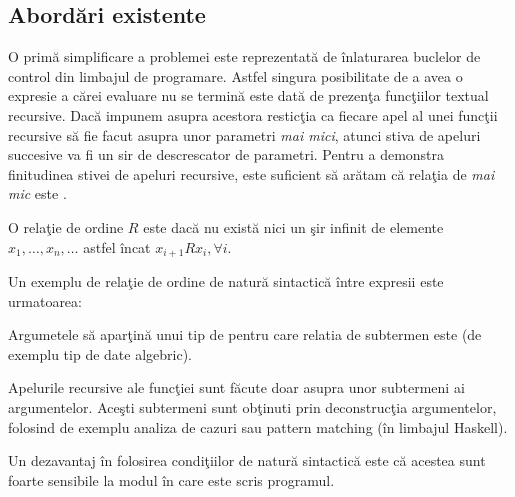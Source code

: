 \subsection{Abord\u ari existente}

O prim\u a simplificare a problemei este reprezentat\u a de \^inlaturarea buclelor de control din limbajul de programare. Astfel singura posibilitate de a avea o expresie a c\u arei evaluare nu se termin\u a este dat\u a de prezen\c ta func\c tiilor textual recursive. Dac\u a impunem asupra acestora restic\c tia ca fiecare apel al unei func\c tii recursive s\u a fie facut asupra unor parametri \emph{mai mici}, atunci stiva de apeluri succesive va fi un sir de descrescator de parametri. Pentru a demonstra finitudinea stivei de apeluri recursive, este suficient s\u a ar\u atam c\u a rela\c tia de \emph{mai mic} este .

\begin{definition}\label{well_founded}
O rela\c tie de ordine $R$ este  dac\u a nu exist\u a nici un \c sir infinit de elemente $x_1, \dots , x_n, \dots$ astfel \^incat $x_{i+1} R x_i,\forall i$.
\end{definition}

\done{}
\begin{example}
Un exemplu de rela\c tie de ordine de natur\u a sintactic\u a \^intre expresii este urmatoarea:
    \begin{itemize*}
      \item Argumetele s\u a apar\c tin\u a unui tip de pentru care relatia de subtermen este  (de exemplu tip de date algebric).
      \item Apelurile recursive ale func\c tiei sunt f\u acute doar asupra unor subtermeni ai argumentelor. Ace\c sti subtermeni sunt ob\c tinuti prin deconstruc\c tia argumentelor, folosind de exemplu analiza de cazuri sau pattern matching (\^in limbajul Haskell).
    \end{itemize*}
\end{example}

\done{}
Un dezavantaj \^in folosirea condi\c tiilor de natur\u a sintactic\u a este c\u a acestea sunt foarte sensibile la modul \^in care este scris programul.

